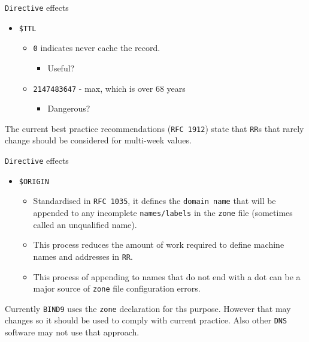 \documentclass[xcolor=table]{beamer}
\begin{document}
\begin{frame}{\texttt{Directive} effects}
  \begin{itemize}
    \item \texttt{\$TTL}
      \begin{itemize}
        \item \texttt{0} indicates never cache the record.
          \begin{itemize}
            \item Useful?
          \end{itemize}
        \item \texttt{2147483647} - max, which is over 68 years
          \begin{itemize}
            \item Dangerous?
          \end{itemize}
      \end{itemize}
  \end{itemize}
  \begin{tcolorbox}[title={\textbf{NOTE:}}]
    The current best practice recommendations (\texttt{RFC 1912}) state that \texttt{RR}s that rarely change should be considered for multi-week values.
  \end{tcolorbox}
\end{frame}

\begin{frame}{\texttt{Directive} effects}
  \begin{itemize}
    \item \texttt{\$ORIGIN}
      \begin{itemize}
        \item Standardised in \texttt{RFC 1035}, it defines the \texttt{domain name} that will be appended to any incomplete \texttt{names/labels} in the \texttt{zone} file (sometimes called an unqualified name).
        \item This process reduces the amount of work required to define machine names and addresses in \texttt{RR}.
        \item This process of appending to names that do not end with a dot can be a major source of \texttt{zone} file configuration errors.
      \end{itemize}
  \end{itemize}
  \begin{tcolorbox}[title={\textbf{NOTE:}}]
    Currently \texttt{BIND9} uses the \texttt{zone} declaration for ths purpose. However that may changes so it should be used to comply with current practice. Also other \texttt{DNS} software may not use that approach.
  \end{tcolorbox}
\end{frame}
\end{document}
